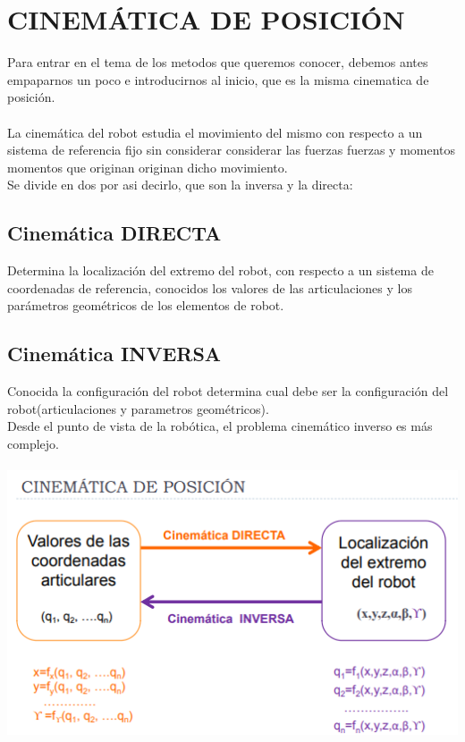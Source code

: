 \documentclass[12pt,a4paper]{article}
\begin{document}
\tableofcontents

\section{CINEMÁTICA DE POSICIÓN
}
Para entrar en el tema de los metodos que queremos conocer, debemos antes empaparnos un poco e introducirnos al inicio, que es la misma cinematica de posición.\\\\

La cinemática del robot estudia el movimiento del mismo con respecto a un sistema de referencia fijo
sin considerar considerar las fuerzas fuerzas
y momentos momentos que originan originan
dicho movimiento.\\
Se divide en dos por asi decirlo, que son la inversa y la directa:\\

\subsection{Cinemática DIRECTA}
Determina la localización del
extremo del robot, con respecto a un sistema de
coordenadas de referencia, conocidos los valores de las articulaciones y los parámetros geométricos de los elementos de robot.\\
\subsection{Cinemática INVERSA}
Conocida la configuración del robot determina cual debe ser la configuración del robot(articulaciones y parametros geométricos).\\

Desde el punto de vista de la robótica, el
problema cinemático inverso es más complejo.\\\\

\includegraphics[scale=1.2]{1.PNG} \\\\\
\end{document}
